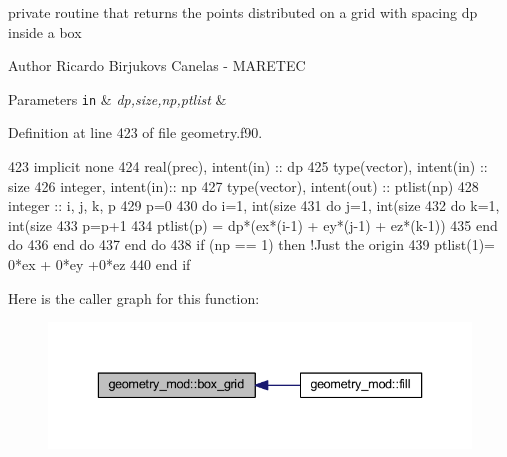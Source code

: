 private routine that returns the points distributed on a grid with spacing dp inside a box 

\begin{DoxyAuthor}{Author}
Ricardo Birjukovs Canelas -\/ M\+A\+R\+E\+T\+EC 
\end{DoxyAuthor}

\begin{DoxyParams}[1]{Parameters}
\mbox{\tt in}  & {\em dp,size,np,ptlist} & \\
\hline
\end{DoxyParams}


Definition at line 423 of file geometry.\+f90.


\begin{DoxyCode}
423     \textcolor{keywordtype}{implicit none}
424     \textcolor{keywordtype}{real(prec)}, \textcolor{keywordtype}{intent(in)} :: dp
425     \textcolor{keywordtype}{type}(vector), \textcolor{keywordtype}{intent(in)} :: size
426     \textcolor{keywordtype}{integer}, \textcolor{keywordtype}{intent(in)}::  np
427     \textcolor{keywordtype}{type}(vector), \textcolor{keywordtype}{intent(out)} :: ptlist(np)
428     \textcolor{keywordtype}{integer} :: i, j, k, p
429     p=0
430     \textcolor{keywordflow}{do} i=1, int(size%
431         \textcolor{keywordflow}{do} j=1, int(size%
432             \textcolor{keywordflow}{do} k=1, int(size%
433                 p=p+1
434                 ptlist(p) = dp*(ex*(i-1) + ey*(j-1) + ez*(k-1))
435 \textcolor{keywordflow}{            end do}
436 \textcolor{keywordflow}{        end do}
437 \textcolor{keywordflow}{    end do}
438     \textcolor{keywordflow}{if} (np == 1) \textcolor{keywordflow}{then} \textcolor{comment}{!Just the origin}
439         ptlist(1)= 0*ex + 0*ey +0*ez
440 \textcolor{keywordflow}{    end if}
\end{DoxyCode}
Here is the caller graph for this function\+:\nopagebreak
\begin{figure}[H]
\begin{center}
\leavevmode
\includegraphics[width=336pt]{namespacegeometry__mod_ae87e4ecff2d21a839da2b82919b5fd0b_icgraph}
\end{center}
\end{figure}
\mbox{\label{namespacegeometry__mod_a1d97564e04562532b5389bfb91aa676b}} 
